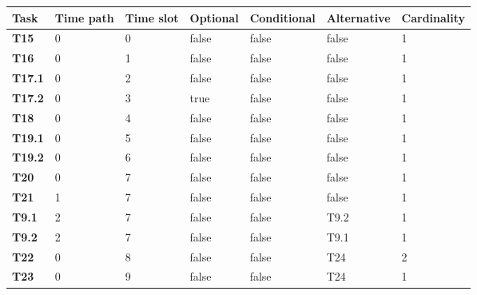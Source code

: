 \begin{table}[h]\label{tab:MPERS_DTMC_SLOTS}
{\renewcommand{\arraystretch}{1.5}
\begin{tabularx}{\textwidth}{@{}lllllll@{}}
\toprule
\textbf{Task}  & \textbf{Time path} & \textbf{Time slot} & \textbf{Optional} & \textbf{Conditional} & \textbf{Alternative} & Cardinality \\ \midrule
\textbf{T15}   & 0                  & 0                  & false             & false                & false                & 1           \\
\textbf{T16}   & 0                  & 1                  & false             & false                & false                & 1           \\
\textbf{T17.1} & 0                  & 2                  & false             & false                & false                & 1           \\
\textbf{T17.2} & 0                  & 3                  & true              & false                & false                & 1           \\
\textbf{T18}   & 0                  & 4                  & false             & false                & false                & 1           \\
\textbf{T19.1} & 0                  & 5                  & false             & false                & false                & 1           \\
\textbf{T19.2} & 0                  & 6                  & false             & false                & false                & 1           \\
\textbf{T20}   & 0                  & 7                  & false             & false                & false                & 1           \\
\textbf{T21}   & 1                  & 7                  & false             & false                & false                & 1           \\
\textbf{T9.1}  & 2                  & 7                  & false             & false                & T9.2                 & 1           \\
\textbf{T9.2}  & 2                  & 7                  & false             & false                & T9.1                 & 1           \\
\textbf{T22}   & 0                  & 8                  & false             & false                & T24                  & 2           \\
\textbf{T23}   & 0                  & 9                  & false             & false                & T24                  & 1           \\

\end{tabularx}}
\end{table}
